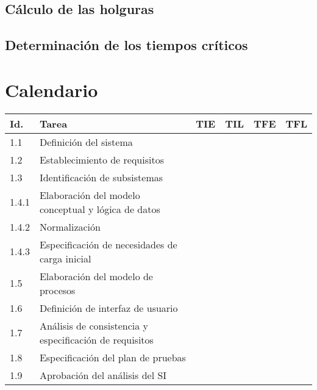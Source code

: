 \documentclass[11pt,a4paper,spanish,twoside]{report}
\begin{document}
\section{Cálculo de las holguras}
\section{Determinación de los tiempos críticos}

\chapter{Calendario}

\begin{table}[!h]
\centering
   \begin{tabular}{|p{0.8cm}||p{5cm}||p{1.5cm}|p{1.5cm}|p{1.5cm}|p{1.5cm}|}
     \hline
     \textbf{Id.} & \textbf{Tarea} & \textbf{TIE} & \textbf{TIL} &
     \textbf{TFE} & \textbf{TFL}\\
     \hline
      1.1 & Definición del sistema  &  &  &  &  \\
      \hline
      1.2 & Establecimiento de requisitos  &  &  &  &  \\
      \hline
      1.3 & Identificación de subsistemas  &  &  &  &  \\
      \hline
      1.4.1 & Elaboración del modelo conceptual y lógica de datos &  &  &  &  \\
      \hline
      1.4.2 & Normalización  &  &  &  &  \\
      \hline
      1.4.3 & Especificación de necesidades de carga inicial  &  &  &  &  \\
      \hline
      1.5 & Elaboración del modelo de procesos  &  &  &  &  \\
      \hline
      1.6 & Definición de interfaz de usuario  &  &  &  &  \\
      \hline
      1.7 & Análisis de consistencia y especificación de requisitos & & & &\\
      \hline
      1.8 & Especificación del plan de pruebas &  &  &  &\\
      \hline
      1.9 & Aprobación del análisis del SI &  &  &  &  \\
      \hline \hline


\end{tabular}
\end{table}
\end{document}
